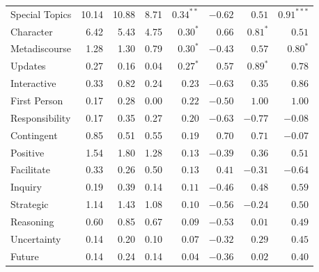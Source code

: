 \begin{table}[tbp]
\begin{tabular}{lrrrrrrr}
Special Topics & 10.14 & 10.88 & 8.71 & $0.34^{**}$ & $-0.62$ & $0.51$ & $0.91^{***}$ \\
Character & 6.42 & 5.43 & 4.75 & $0.30^{*}$ & $0.66$ & $0.81^{*}$ & $0.51$ \\
Metadiscourse & 1.28 & 1.30 & 0.79 & $0.30^{*}$ & $-0.43$ & $0.57$ & $0.80^{*}$ \\
Updates & 0.27 & 0.16 & 0.04 & $0.27^{*}$ & $0.57$ & $0.89^{*}$ & $0.78$ \\
Interactive & 0.33 & 0.82 & 0.24 & $0.23$ & $-0.63$ & $0.35$ & $0.86$ \\
First Person & 0.17 & 0.28 & 0.00 & $0.22$ & $-0.50$ & $1.00$ & $1.00$ \\
Responsibility & 0.17 & 0.35 & 0.27 & $0.20$ & $-0.63$ & $-0.77$ & $-0.08$ \\
Contingent & 0.85 & 0.51 & 0.55 & $0.19$ & $0.70$ & $0.71$ & $-0.07$ \\
Positive & 1.54 & 1.80 & 1.28 & $0.13$ & $-0.39$ & $0.36$ & $0.51$ \\
Facilitate & 0.33 & 0.26 & 0.50 & $0.13$ & $0.41$ & $-0.31$ & $-0.64$ \\
Inquiry & 0.19 & 0.39 & 0.14 & $0.11$ & $-0.46$ & $0.48$ & $0.59$ \\
Strategic & 1.14 & 1.43 & 1.08 & $0.10$ & $-0.56$ & $-0.24$ & $0.50$ \\
Reasoning & 0.60 & 0.85 & 0.67 & $0.09$ & $-0.53$ & $0.01$ & $0.49$ \\
Uncertainty & 0.14 & 0.20 & 0.10 & $0.07$ & $-0.32$ & $0.29$ & $0.45$ \\
Future & 0.14 & 0.24 & 0.14 & $0.04$ & $-0.36$ & $0.02$ & $0.40$ \\
\bottomrule
\end{tabular}
\end{table}
